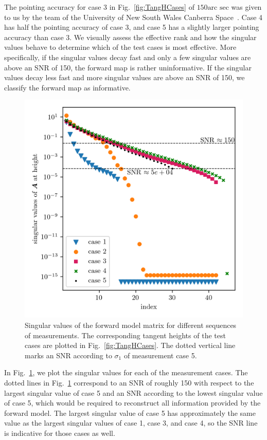 The pointing accuracy for case 3 in Fig.~\ref{fig:TangHCases} of $150\text{arc sec}$ was given to us by the team of the University of New South Wales Canberra Space~\cite{CubeSatInternal}.
Case 4 has half the pointing accuracy of case 3, and case 5 has a slightly larger pointing accuracy than case 3.
We visually assess the effective rank and how the singular values behave to determine which of the test cases is most effective.
More specifically, if the singular values decay fast and only a few singular values are above an SNR of 150, the forward map is rather uninformative.
If the singular values decay less fast and more singular values are above an SNR of 150, we classify the forward map as informative.

\begin{figure}[ht!]
	\centering
	\includegraphics{SingValA.png}
	\caption[Singular values of linear forward model matrix for different sequences of measurements.]{Singular values of the forward model matrix for different sequences of measurements.
	The corresponding tangent heights of the test cases are plotted in Fig.~\ref{fig:TangHCases}. The dotted vertical line marks an SNR according to $\sigma_1$ of measurement case 5.}
\label{fig:SingA}
\end{figure}
In Fig.~\ref{fig:SingA}, we plot the singular values for each of the measurement cases.
The dotted lines in Fig.~\ref{fig:SingA} correspond to an SNR of roughly 150 with respect to the largest singular value of case 5 and an SNR according to the lowest singular value of case 5, which would be required to reconstruct all information provided by the forward model.
The largest singular value of case 5 has approximately the same value as the largest singular values of case 1, case 3, and case 4, so the SNR line is indicative for those cases as well.

